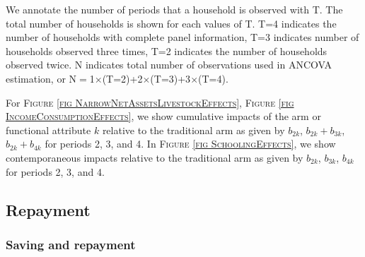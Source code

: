 	We annotate the number of periods that a household is observed with \textsf{T}. The total number of households is shown for each values of \textsf{T}. \textsf{T=4} indicates the number of households with complete panel information, \textsf{T=3} indicates number of households observed three times, \textsf{T=2} indicates the number of households observed twice. \textsf{N} indicates total number of observations used in ANCOVA estimation, or \textsf{N$=$1$\times$(T=2)+2$\times$(T=3)+3$\times$(T=4)}. 
	
	For \textsc{\footnotesize Figure \ref{fig NarrowNetAssetsLivestockEffects}}, \textsc{\small Figure \ref{fig IncomeConsumptionEffects}}, we show cumulative impacts of the arm or functional attribute $k$ relative to the \textsf{traditional} arm as given by $b_{2k}$, $b_{2k}+b_{3k}$,  $b_{2k}+b_{4k}$ for periods 2, 3, and 4. In \textsc{\footnotesize Figure \ref{fig SchoolingEffects}}, we show contemporaneous impacts relative to the \textsf{traditional} arm as given by $b_{2k}$, $b_{3k}$,  $b_{4k}$ for periods 2, 3, and 4.





\subsection{Repayment}
\label{Sec App Repay}
\subsubsection{Saving and repayment}

